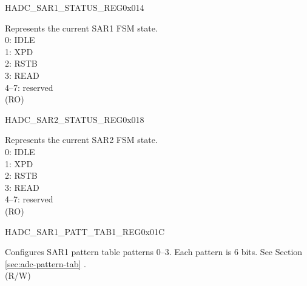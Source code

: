 \begin{register}{H}{ADC\_SAR1\_STATUS\_REG}{0x014}\label{regdesc:ADCSAR1STATUSREG}
%
%
\regnewline%
\begin{regdesc}\begin{reglist}
\label{fielddesc:ADCSAR1STATE}\item [ADC\_SAR1\_STATE] Represents the current SAR1 FSM state.\\
0: IDLE\\
1: XPD\\
2: RSTB\\
3: READ\\
4--7: reserved\\
(RO)
\end{reglist}\end{regdesc}
\end{register}


\begin{register}{H}{ADC\_SAR2\_STATUS\_REG}{0x018}\label{regdesc:ADCSAR2STATUSREG}
%
%
\regnewline%
\begin{regdesc}\begin{reglist}
\label{fielddesc:ADCSAR2STATE}\item [ADC\_SAR2\_STATE] Represents the current SAR2 FSM state.\\
0: IDLE\\
1: XPD\\
2: RSTB\\
3: READ\\
4--7: reserved\\
(RO)
\end{reglist}\end{regdesc}
\end{register}


\begin{register}{H}{ADC\_SAR1\_PATT\_TAB1\_REG}{0x01C}\label{regdesc:ADCSAR1PATTTAB1REG}
%
%
\regnewline%
\begin{regdesc}\begin{reglist}
\label{fielddesc:ADCSAR1PATTTAB1}\item [ADC\_SAR1\_PATT\_TAB1] Configures SAR1 pattern table patterns 0--3. Each pattern is 6 bits. See Section \ref{sec:adc-pattern-tab} \textit{}.\\
(R/W)
\end{reglist}\end{regdesc}
\end{register}


